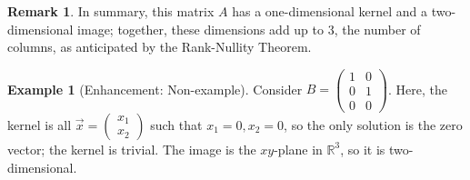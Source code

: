 \documentclass[12pt]{article}
\theoremstyle{definition}
\newtheorem{example}{Example}[section]
\newtheorem{remark}{Remark}[section]
\theoremstyle{plain}
\begin{document}
\begin{enumerate}[label=(\alph*)]
\begin{center}
\end{center}

\begin{remark}
    In summary, this matrix \( A \) has a one-dimensional kernel and a two-dimensional image; together, these dimensions add up to 3, the number of columns, as anticipated by the Rank-Nullity Theorem.
\end{remark}

\end{enumerate}

\begin{example}[Enhancement: Non-example]
    Consider \( B = \begin{pmatrix} 1 & 0 \\ 0 & 1 \\ 0 & 0 \end{pmatrix} \). Here, the kernel is all \( \vec{x} = \begin{pmatrix}x_1 \\ x_2\end{pmatrix} \) such that \( x_1 = 0, x_2=0 \), so the only solution is the zero vector; the kernel is trivial. The image is the $xy$-plane in \( \mathbb{R}^3 \), so it is two-dimensional.
\end{example}
\end{document}
